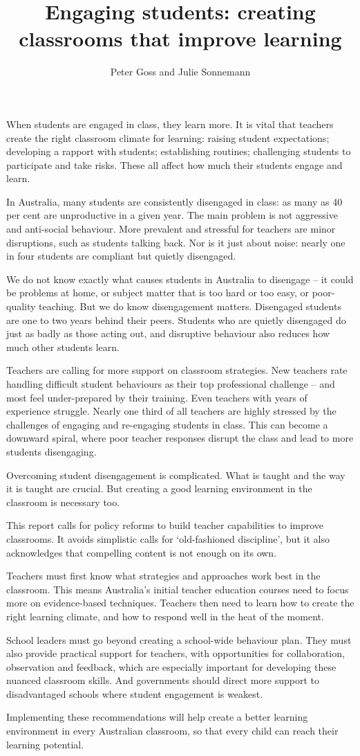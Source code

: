 \documentclass{grattan}
\author{Peter Goss and Julie Sonnemann}
\title{Engaging students: creating classrooms that improve learning}
\begin{document}
\begin{overview}
When students are engaged in class, they learn more. It is vital that teachers create the right classroom climate for learning: raising student expectations; developing a rapport with students; establishing routines; challenging students to participate and take risks. These all affect how much their students engage and learn.

In Australia, many students are consistently disengaged in class: as many as 40 per cent are unproductive in a given year. The main problem is not aggressive and anti-social behaviour. More prevalent and stressful for teachers are minor disruptions, such as students talking back. Nor is it just about noise: nearly one in four students are compliant but quietly disengaged.

We do not know exactly what causes students in Australia to disengage -- it could be problems at home, or subject matter that is too hard or too easy, or poor-quality teaching. But we do know disengagement matters. Disengaged students are one to two years behind their peers. Students who are quietly disengaged do just as badly as those acting out, and disruptive behaviour also reduces how much other students learn.

Teachers are calling for more support on classroom strategies. New teachers rate handling difficult student behaviours as their top professional challenge -- and most feel under-prepared by their training. Even teachers with years of experience struggle. Nearly one third of all teachers are highly stressed by the challenges of engaging and re-engaging students in class. This can become a downward spiral, where poor teacher responses disrupt the class and lead to more students disengaging.

Overcoming student disengagement is complicated. What is taught and the way it is taught are crucial. But creating a good learning environment in the classroom is necessary too.

This report calls for policy reforms to build teacher capabilities to improve classrooms. It avoids simplistic calls for `old-fashioned discipline', but it also acknowledges that compelling content is not enough on its own.

Teachers must first know what strategies and approaches work best in the classroom. This means Australia's initial teacher education courses need to focus more on evidence-based techniques. Teachers then need to learn how to create the right learning climate, and how to respond well in the heat of the moment.

School leaders must go beyond creating a school-wide behaviour plan. They must also provide practical support for teachers, with opportunities for collaboration, observation and feedback, which are especially important for developing these nuanced classroom skills. And governments should direct more support to disadvantaged schools where student engagement is weakest.

Implementing these recommendations will help create a better learning environment in every Australian classroom, so that every child can reach their learning potential.
\end{overview}
\end{document}
